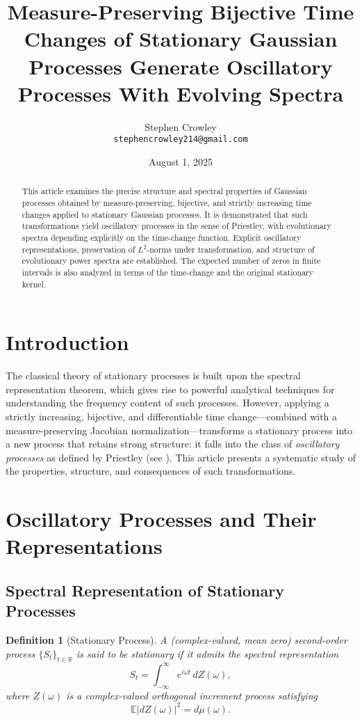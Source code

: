 \documentclass[12pt]{article}
\title{Measure-Preserving Bijective Time Changes of Stationary Gaussian Processes Generate Oscillatory Processes With Evolving Spectra}
\author{Stephen Crowley\\
\texttt{stephencrowley214@gmail.com}}
\date{August 1, 2025}
\newtheorem{definition}{Definition}[section]
\begin{document}
\maketitle

\begin{abstract}
This article examines the precise structure and spectral properties of Gaussian processes obtained by measure-preserving, bijective, and strictly increasing time changes applied to stationary Gaussian processes. It is demonstrated that such transformations yield oscillatory processes in the sense of Priestley, with evolutionary spectra depending explicitly on the time-change function. Explicit oscillatory representations, preservation of $L^2$-norms under transformation, and structure of evolutionary power spectra are established. The expected number of zeros in finite intervals is also analyzed in terms of the time-change and the original stationary kernel.
\end{abstract}

\tableofcontents

\section{Introduction}\label{sec:intro}

The classical theory of stationary processes is built upon the spectral representation theorem, which gives rise to powerful analytical techniques for understanding the frequency content of such processes. However, applying a strictly increasing, bijective, and differentiable time change---combined with a measure-preserving Jacobian normalization---transforms a stationary process into a new process that retains strong structure: it falls into the class of \emph{oscillatory processes} as defined by Priestley (see \cite{priestley1965}). This article presents a systematic study of the properties, structure, and consequences of such transformations.

\section{Oscillatory Processes and Their Representations}

\subsection{Spectral Representation of Stationary Processes}

\begin{definition}[Stationary Process]\label{def:stationary_process}
A (complex-valued, mean zero) second-order process $\{S_t\}_{t \in \mathbb{R}}$ is said to be \emph{stationary} if it admits the spectral representation
\begin{equation}
    S_t = \int_{-\infty}^{\infty} e^{i\omega t} \, dZ(\omega),
    \label{eq:spectral_stationary}
\end{equation}
where $Z(\omega)$ is a complex-valued orthogonal increment process satisfying
\begin{equation}
    \mathbb{E}|dZ(\omega)|^2 = d\mu(\omega).
    \label{eq:incr_variance}
\end{equation}
\end{definition}
\end{document}

